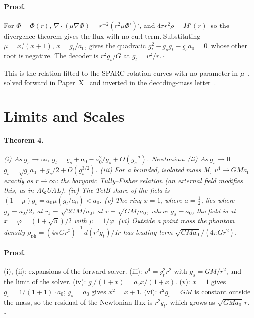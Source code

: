 \documentclass[twocolumn]{iopjournal}
\begin{document}
\paragraph{Proof.} For $\Phi = \Phi(r)$,
$\nabla\cdot(\mu\nabla\Phi) = r^{-2}(r^2\mu\Phi')'$, and
$4\pi r^2\rho = M'(r)$, so the divergence theorem gives the flux with no
curl term. Substituting $\mu = x/(x+1)$, $x = g_t/a_0$, gives the
quadratic $g_t^2 - g_s g_t - g_s a_0 = 0$, whose other root is
negative. The decoder is $r^2 g_s/G$ at $g_t = v^2/r$. \hfill $\square$

\medskip
\noindent
This is the relation fitted to the SPARC rotation curves with no
parameter in $\mu$~\cite{NelsonRAR}, solved forward in
Paper~X~\cite{NelsonX} and inverted in the decoding-mass
letter~\cite{NelsonDEC}.


\section*{Limits and Scales}

\paragraph{Theorem 4.} \textit{(i) As $g_s \to \infty$,
$g_t = g_s + a_0 - a_0^2/g_s + O(g_s^{-2})$: Newtonian. (ii) As
$g_s \to 0$, $g_t = \sqrt{g_s a_0} + g_s/2 + O(g_s^{3/2})$. (iii) For a
bounded, isolated mass $M$, $v^4 \to GMa_0$ exactly as $r \to \infty$:
the baryonic Tully--Fisher relation (an external field modifies this,
as in AQUAL). (iv) The TetB share of the field is
$(1-\mu)g_t = a_0\mu(g_t/a_0) < a_0$. (v) The ring $x = 1$, where
$\mu = \tfrac12$, lies where $g_s = a_0/2$, at
$r_1 = \sqrt{2GM/a_0}$; at $r = \sqrt{GM/a_0}$, where $g_s = a_0$, the
field is at $x = \varphi = (1+\sqrt5)/2$ with $\mu = 1/\varphi$.
(vi) Outside a point mass the phantom density
$\rho_{\mathrm{ph}} = (4\pi G r^2)^{-1}\,d(r^2 g_t)/dr$ has leading term
$\sqrt{GMa_0}/(4\pi G r^2)$.}

\paragraph{Proof.} (i), (ii): expansions of the forward solver. (iii):
$v^4 = g_t^2 r^2$ with $g_s = GM/r^2$, and the limit of the solver.
(iv): $g_t/(1+x) = a_0 x/(1+x)$. (v): $x = 1$ gives
$g_s = 1/(1+1)\cdot a_0$; $g_s = a_0$ gives $x^2 = x + 1$. (vi):
$r^2 g_s = GM$ is constant outside the mass, so the residual of the
Newtonian flux is $r^2 g_t$, which grows as $\sqrt{GMa_0}\,r$.
\hfill $\square$
\end{document}
